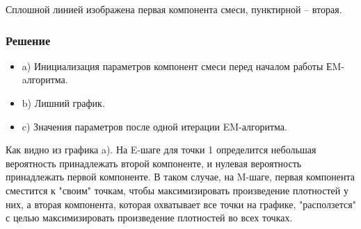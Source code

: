 \documentclass[12pt]{article}
\begin{document}
Сплошной линией изображена первая компонента смеси, пунктирной -- вторая.

\subsubsection*{Решение}
\begin{itemize}
\item a) Инициализация параметров компонент смеси перед началом работы ЕM-aлгоритма.
\item b) Лишний график.
\item c) Значения параметров после одной итерации EM-алгоритма.
\end{itemize}

Как видно из графика a). На E-шаге для точки 1 определится небольшая вероятность
принадлежать второй компоненте, и нулевая вероятность принадлежать первой
компоненте. В таком случае, на M-шаге, первая компонента сместится к
"своим" точкам, чтобы максимизировать произведение плотностей у них, а вторая
компонента, которая охватывает все точки на графике, "расползется"
с целью максимизировать произведение плотностей во всех точках.
\end{document}

